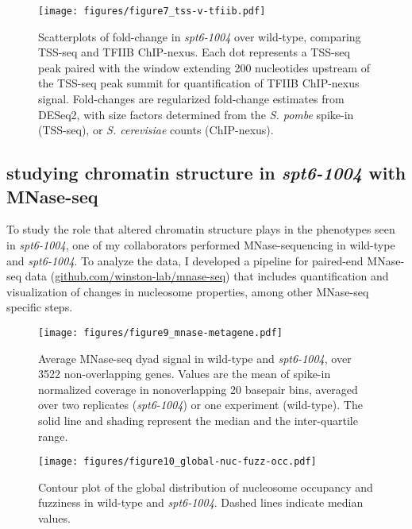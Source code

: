 \documentclass[11pt, letterpaper]{article}
\begin{document}
\begin{figure}[h]
\centering
\texttt{[image: figures/figure7\_tss-v-tfiib.pdf]}
\caption{Scatterplots of fold-change in \textit{spt6-1004} over wild-type, comparing TSS-seq and TFIIB ChIP-nexus. Each dot represents a TSS-seq peak paired with the window extending 200 nucleotides upstream of the TSS-seq peak summit for quantification of TFIIB ChIP-nexus signal. Fold-changes are regularized fold-change estimates from DESeq2, with size factors determined from the \textit{S. pombe} spike-in (TSS-seq), or \textit{S. cerevisiae} counts (ChIP-nexus).}
\end{figure}

\subsection{studying chromatin structure in \textit{spt6-1004} with MNase-seq}

To study the role that altered chromatin structure plays in the phenotypes seen in \textit{spt6-1004}, one of my collaborators performed MNase-sequencing in wild-type and \textit{spt6-1004}. To analyze the data, I developed a pipeline for paired-end MNase-seq data (\href{https://github.com/winston-lab/mnase-seq}{github.com/winston-lab/mnase-seq}) that includes quantification and visualization of changes in nucleosome properties, among other MNase-seq specific steps.

\begin{figure}[h]
    \centering
    \begin{minipage}[t]{8.5cm}
        \centering
        \texttt{[image: figures/figure9\_mnase-metagene.pdf]}
        \caption{Average MNase-seq dyad signal in wild-type and \textit{spt6-1004}, over 3522 non-overlapping genes. Values are the mean of spike-in normalized coverage in nonoverlapping 20 basepair bins, averaged over two replicates (\textit{spt6-1004}) or one experiment (wild-type). The solid line and shading represent the median and the inter-quartile range.}
        \label{fig:mnase_metagene}
    \end{minipage}\hfill
    \begin{minipage}[t]{8.5cm}
        \centering
        \texttt{[image: figures/figure10\_global-nuc-fuzz-occ.pdf]}
        \caption{Contour plot of the global distribution of nucleosome occupancy and fuzziness in wild-type and \textit{spt6-1004}. Dashed lines indicate median values.}
        \label{fig:global_nuc_fuzz}
    \end{minipage}
\end{figure}
\end{document}
